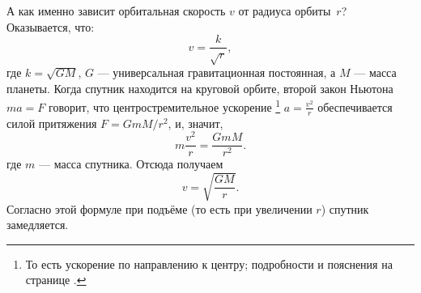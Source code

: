 А как именно зависит орбитальная скорость \(v\) от радиуса орбиты~\(r\)?
Оказывается, что:
\[
v=\frac{k}{\sqrt{r}},
\]
где \(k=\sqrt{GM}\),
\(G\) --- универсальная гравитационная постоянная,
а \(M\) --- масса планеты.
Когда спутник находится на круговой орбите, второй закон Ньютона \(ma=F\) говорит, что центростремительное ускорение%
\footnote{То есть ускорение по направлению к центру; подробности и пояснения на странице \pageref{Центростремительное ускорение}.}
$a=\frac{v^2}{r}$ обеспечивается силой притяжения $F={GmM}/{r^2}$, и, значит,
\[
m \frac{v^2}{r}=\frac{GmM}{r^2}.
\]
где \(m\) --- масса спутника.
Отсюда получаем
\[
v=\sqrt{\frac{GM}{r}}.
\]
Согласно этой формуле при подъёме (то есть при увеличении \(r\)) спутник замедляется.
